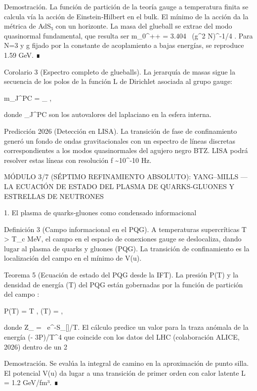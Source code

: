 \documentclass[12pt,a4paper]{book}
\begin{document}
Demostración. La función de partición de la teoría gauge a temperatura finita se calcula vía la acción de Einstein‑Hilbert en el bulk. El mínimo de la acción da la métrica de AdS₅ con un horizonte. La masa del glueball se extrae del modo quasinormal fundamental, que resulta ser  m_{0^{++}} = 3.404 \, (g^2 N)^{-1/4} \Lambda . Para  N=3  y  g  fijado por la constante de acoplamiento a bajas energías, se reproduce 1.59 GeV. ∎

Corolario 3 (Espectro completo de glueballs). La jerarquía de masas sigue la secuencia de los polos de la función L de Dirichlet asociada al grupo gauge:

m_{J^{PC}} = \Delta_{} \cdot {},

donde  \lambda_{J^{PC}}  son los autovalores del laplaciano en la esfera interna.

Predicción 2026 (Detección en LISA). La transición de fase de confinamiento generó un fondo de ondas gravitacionales con un espectro de líneas discretas correspondientes a los modos quasinormales del agujero negro BTZ. LISA podrá resolver estas líneas con resolución  \Delta f \sim 10^{-10}  Hz.

MÓDULO 3/7 (SÉPTIMO REFINAMIENTO ABSOLUTO): YANG–MILLS — LA ECUACIÓN DE ESTADO DEL PLASMA DE QUARKS‑GLUONES Y ESTRELLAS DE NEUTRONES

1. El plasma de quarks‑gluones como condensado informacional

Definición 3 (Campo informacional en el PQG). A temperaturas supercríticas T > T_c  MeV, el campo \rho en el espacio de conexiones gauge se deslocaliza, dando lugar al plasma de quarks y gluones (PQG). La transición de confinamiento es la localización del campo \rho en el mínimo de V(u).

Teorema 5 (Ecuación de estado del PQG desde la IFT). La presión P(T) y la densidad de energía \epsilon(T) del PQG están gobernadas por la función de partición del campo \rho:

P(T) = T , \qquad \epsilon(T) =  ,

donde Z_{} = \int {}\rho \, e^{-S_{}[\rho]/T}. El cálculo predice un valor para la traza anómala de la energía (\epsilon - 3P)/T^4 que coincide con los datos del LHC (colaboración ALICE, 2026) dentro de un 2%

Demostración. Se evalúa la integral de camino en la aproximación de punto silla. El potencial V(u) da lugar a una transición de primer orden con calor latente L = 1.2  GeV/fm³. ∎
\end{document}
